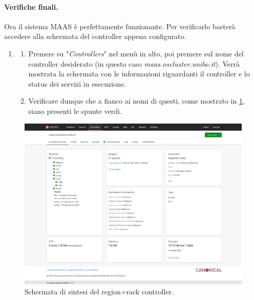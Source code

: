 \paragraph{Verifiche finali.}%
Ora il sistema MAAS è perfettamente funzionante.
% 
Per verificarlo basterà accedere alla schermata del controller appena configurato.
\begin{enumerate}
    \item[] 
    \begin{enumerate}
        \item Premere su "\emph{Controllers}" nel menù in alto, poi premere sul nome del controller desiderato (in questo caso \emph{maas.oscluster.unibo.it}).
        Verrà mostrata la schermata con le informazioni riguardanti il controller e lo status dei servizi in esecuzione.
        
        \item Verificare dunque che a fianco ai nomi di questi, come mostrato in \cref{fig:maas_sum_region+rack}, siano presenti le spunte verdi.
    \end{enumerate}
\end{enumerate}
% 
\begin{figure}[H]
    \centering
    \includegraphics[width=1\linewidth]{tesi/files/immagini/maas/services_controller}
    \caption{Schermata di sintesi del region+rack controller.}
    \label{fig:maas_sum_region+rack}
\end{figure}
% 
